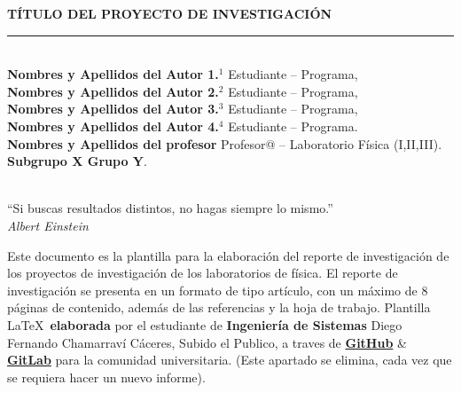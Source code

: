 \documentclass[11pt]{article}
\begin{document}
	
	\vspace*{0.1cm}
	\begin{center}
		{\Large \textbf{TÍTULO DEL PROYECTO DE INVESTIGACIÓN}}\\ %
		\vspace*{-0.4 cm}
		{\color{VerdeUIS}\rule{\textwidth}{1.4pt}} \\
		\textbf{Nombres y Apellidos del Autor 1.$^1$} Estudiante – Programa,\\
		\textbf{Nombres y Apellidos del Autor 2.$^2$} Estudiante – Programa,\\
		\textbf{Nombres y Apellidos del Autor 3.$^3$ }Estudiante – Programa,\\
		\textbf{Nombres y Apellidos del Autor 4.$^4$} Estudiante – Programa.\\
		\textbf{Nombres y Apellidos del profesor} Profesor@ – Laboratorio Física (I,II,III).\\ %
		\textbf{Subgrupo X Grupo Y}.\\ %
	\end{center}
	
	\vspace*{-0.9 cm}
	\begin{flushright}
		 \\
		``Si buscas resultados distintos, no hagas siempre lo mismo.'' \\  %
		\textit{Albert Einstein}
	\end{flushright}
	
	\vspace*{-0.4 cm}
	
	Este documento es la plantilla para la elaboración del reporte de investigación de los proyectos de investigación de los laboratorios de física. El reporte de investigación se presenta en un formato de tipo artículo, con un máximo de 8 páginas de contenido, además de las referencias y la hoja de trabajo. Plantilla \LaTeX\ \textbf{elaborada} por el estudiante de\textbf{ Ingeniería de Sistemas} Diego Fernando Chamarraví Cáceres, Subido el Publico, a traves de \href{}{\textbf{GitHub}} \& \href{https://gitlab.com/MrChamarravi-Dev/plantilla-latex-informes-laboratorio-fisica-i-iii-universidad-industrial-de-santander.git}{\textbf{GitLab}} para la comunidad universitaria. (Este apartado se elimina, cada vez que se requiera hacer un nuevo informe).   
	
\end{document}
